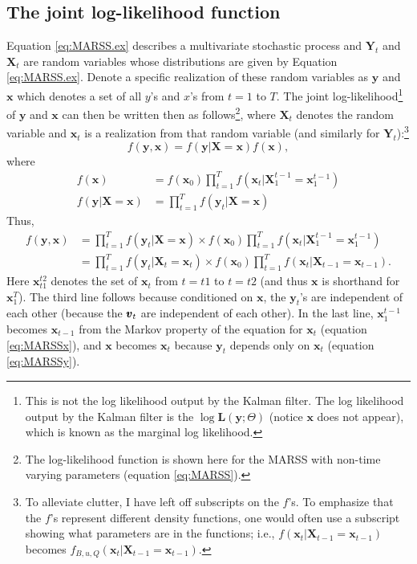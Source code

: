 \documentclass[]{article}
\def\XX{\mbox{$\pmb{X}$}}	\def\xx{\mbox{$\pmb{x}$}}
\def\YY{\mbox{$\pmb{Y}$}}	\def\yy{\mbox{$\pmb{y}$}}
\def\LL{\mbox{$\pmb{L}$}}	\def\ll{\mbox{$\pmb{l}$}}
\begin{document}
\subsection{The joint log-likelihood function}
Equation \ref{eq:MARSS.ex} describes a multivariate stochastic process and $\YY_t$ and $\XX_t$ are random variables whose distributions are given by Equation \ref{eq:MARSS.ex}. Denote a specific realization of these random variables as $\yy$ and $\xx$ which denotes a set of all $y$'s and $x$'s from $t=1$ to $T$. The joint log-likelihood\footnote{This is not the log likelihood output by the Kalman filter.  The log likelihood output by the Kalman filter is the $\log\LL(\yy;\Theta)$ (notice $\xx$ does not appear), which is known as the marginal log likelihood.} of $\yy$ and $\xx$ can then be written then as follows\footnote{The log-likelihood function is shown here for the MARSS with non-time varying parameters (equation \ref{eq:MARSS}).}, where $\XX_t$ denotes the random variable and $\xx_t$ is a realization from that random variable (and similarly for $\YY_t$):\footnote{To alleviate clutter, I have left off subscripts on the $f$'s.  To emphasize that the $f$'s represent different density functions, one would often use a subscript showing what parameters are in the functions; i.e., $f(\xx_t|\XX_{t-1}=\xx_{t-1})$ becomes $f_{B,u,Q}(\xx_t|\XX_{t-1}=\xx_{t-1})$.}
\begin{equation}
f(\yy,\xx) = f(\yy|\XX=\xx)f(\xx),
\end{equation}
where
\begin{equation}
\begin{split}
f(\xx)&=f(\xx_0)\prod_{t=1}^T f(\xx_t|\XX_1^{t-1}=\xx_1^{t-1})\\
f(\yy|\XX=\xx) &= \prod_{t=1}^T f(\yy_t|\XX=\xx)
\end{split}
\end{equation}
Thus,
\begin{equation}\label{eq:jointL}
\begin{split}f(\yy,\xx) &= \prod_{t=1}^T f(\yy_t|\XX=\xx) \times f(\xx_0)\prod_{t=1}^T f(\xx_t|\XX_1^{t-1}=\xx_1^{t-1}) \\
&=\prod_{t=1}^T f(\yy_t|\XX_t=\xx_t) \times f(\xx_0)\prod_{t=1}^T f(\xx_t|\XX_{t-1}=\xx_{t-1}).
\end{split}
\end{equation}
Here $\xx_{t1}^{t2}$ denotes the set of $\xx_t$ from $t=t1$ to $t=t2$ (and thus $\xx$ is shorthand for $\xx_1^T$).  The third line follows because conditioned on $\xx$, the $\yy_t$'s are independent of each other (because the $\mbox{$\pmb{v}$}_t$ are independent of each other).  In the last line, $\xx_1^{t-1}$ becomes $\xx_{t-1}$ from the Markov property of the equation for $\xx_t$ (equation \ref{eq:MARSSx}), and $\xx$ becomes $\xx_t$ because $\yy_t$ depends only on $\xx_t$ (equation \ref{eq:MARSSy}).
\end{document}
